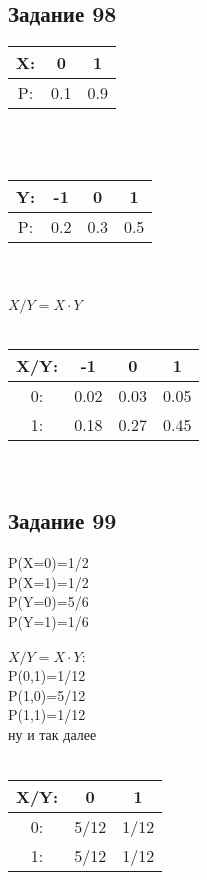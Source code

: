 \documentclass[12pt]{article}
\begin{document}
\subsection{Задание 98}
\begin{tabular}{|c|c|c|}
\hline
X: & 0 & 1  \\
\hline
P: & 0.1 & 0.9 \\
\hline
\end{tabular}
\\
\\
\begin{tabular}{|c|c|c|c|}
\hline
Y: & -1 & 0 & 1  \\
\hline
P: & 0.2 & 0.3 & 0.5 \\
\hline
\end{tabular}
\\
\\
$X/Y = X\cdot Y$\\
\\
\begin{tabular}{|c|c|c|c|}
\hline
X/Y: & -1 & 0 & 1  \\
\hline
0: & 0.02 & 0.03 & 0.05 \\
\hline
1: & 0.18 & 0.27 & 0.45 \\
\hline
\end{tabular}
\\ 
\newpage
\subsection{Задание 99}
P(X=0)=1/2\\
P(X=1)=1/2\\
P(Y=0)=5/6\\
P(Y=1)=1/6\\
\\
$X/Y=X\cdot Y:$\\
P(0,1)=1/12\\
P(1,0)=5/12\\
P(1,1)=1/12\\
ну и так далее\\
\\
\begin{tabular}{|c|c|c|}
\hline
X/Y: & 0 & 1  \\
\hline
0: & 5/12 & 1/12 \\
\hline
1: & 5/12 & 1/12 \\
\hline
\end{tabular}
\\
\newpage
\end{document}
